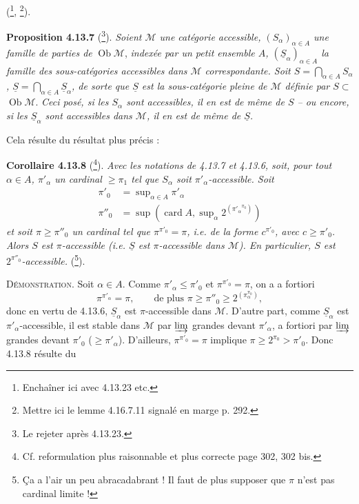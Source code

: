 \documentclass[11pt]{article}
\newcommand{\printedpage}[1]{\marginpar{\footnotesize p.~#1}}
\newcommand{\msp}[1]{\marginpar{\footnotesize [#1]}}
\newcommand{\M}{\mathcal{M}}
\newcommand{\Ob}{\operatorname{Ob}}
\newcommand{\card}{\operatorname{card}}
\newcommand{\uS}{\underline{S}}
\begin{document}
(\footnote[119]{Enchaîner ici avec 4.13.23 etc.}, \footnote[120]{Mettre ici le lemme 4.16.7.11 signalé en marge p. 292.}).

\printedpage{108}
\msp{page 291}
\textbf{Proposition 4.13.7} (\footnote[121]{Le rejeter après 4.13.23.}). \textit{Soient $\M$ une catégorie accessible, $(S_\alpha)_{\alpha\in A}$ une famille de parties de} $\Ob\M$, \textit{indexée par un petit ensemble $A$, $(\uS_\alpha)_{\alpha\in A}$ la famille des sous-catégories accessibles dans $\M$ correspondante. Soit $S = \bigcap_{\alpha\in A} S_\alpha$, $\uS = \bigcap_{\alpha\in A} \uS_\alpha$, de sorte que $\uS$ est la sous-catégorie pleine de $\M$ définie par $S \subset$} $\Ob\M$. \textit{Ceci posé, si les $S_\alpha$ sont accessibles, il en est de même de $S$ – ou encore, si les $\uS_\alpha$ sont accessibles dans $\M$, il en est de même de $\uS$.}

Cela résulte du résultat plus précis :

\textbf{Corollaire 4.13.8} (\footnote[122]{Cf. reformulation plus raisonnable et plus correcte page 302, 302 bis.}). \textit{Avec les notations de 4.13.7 et 4.13.6, soit, pour tout $\alpha \in A$, $\pi'_\alpha$ un cardinal $\geqslant \pi_1$ tel que $S_\alpha$ soit $\pi'_\alpha$-accessible. Soit}
\[
\begin{aligned}
\pi'_0 &= \sup\nolimits_{\alpha\in A} \pi'_\alpha \\
\pi''_0 &= \sup(\card A, \sup\nolimits_\alpha 2^{({\pi'_\alpha}^{\pi_0})})
\end{aligned}
\]
\textit{et soit $\pi \geqslant \pi''_0$ un cardinal tel que $\pi^{\pi'_0} = \pi$, i.e. de la forme $c^{\pi'_0}$, avec $c \geqslant \pi'_0$. Alors $S$ est $\pi$-accessible (i.e. $\uS$ est $\pi$-accessible dans $\M$). En particulier, $S$ est $2^{\pi''_0}$-accessible.} (\footnote[123]{Ça a l'air un peu abracadabrant ! Il faut de plus supposer que $\pi$ n'est pas cardinal limite !}).

\msp{page 292}
\textsc{Démonstration}. Soit $\alpha \in A$. Comme $\pi'_\alpha \leqslant \pi'_0$ et $\pi^{\pi'_0} = \pi$, on a a fortiori
\[
\pi^{\pi'_\alpha} = \pi , \qquad \text{de plus } \pi \geqslant \pi''_0 \geqslant 2^{(\pi_\alpha^{\pi_0})} , %
\]
donc en vertu de 4.13.6, $\uS_\alpha$ est $\pi$-accessible dans $\M$. D'autre part, comme $\uS_\alpha$ est $\pi'_\alpha$-accessible, il est stable dans $\M$ par $\varinjlim$ grandes devant $\pi'_\alpha$, a fortiori par $\varinjlim$ grandes devant $\pi'_0$ ($\geqslant \pi'_\alpha$). D'ailleurs, $\pi^{\pi'_0} = \pi$ implique $\pi \geqslant 2^{\pi_0} > \pi'_0$. Donc 4.13.8 résulte du
\end{document}
